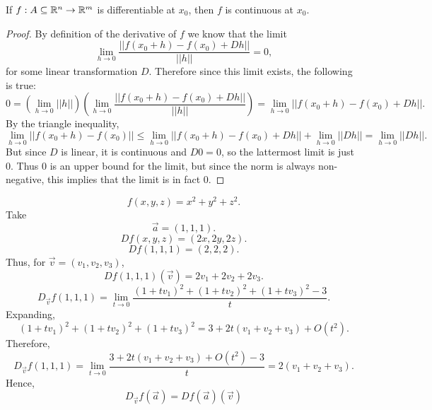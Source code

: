 \begin{proposition}
    If $f: A \subseteq \mathbb{R}^n \rightarrow \mathbb{R}^m$ is differentiable at $x_0$, then $f$ is continuous at $x_0$.
\end{proposition}
\begin{proof}
    By definition of the derivative of $f$ we know that the limit
$$
\lim_{h \rightarrow 0} \frac{|| f(x_0+h) - f(x_0) + D h || }{||h||} = 0,
$$
for some linear transformation $D$. Therefore since this limit exists, the following is true:
$$
0 = \left( \lim_{h \rightarrow 0} || h ||\right)\left( \lim_{h \rightarrow 0} \frac{|| f(x_0+h) - f(x_0) + D h || }{||h||} \right) = \lim_{h \rightarrow 0} ||f(x_0+h) - f(x_0) + Dh ||.
$$
By the triangle inequality,
$$
\lim_{h \rightarrow 0}||f(x_0+h) - f(x_0) || \leq \lim_{h \rightarrow 0}||f(x_0+h) - f(x_0) +Dh || + \lim_{h \rightarrow 0}||Dh || =\lim_{h \rightarrow 0}||Dh ||.
$$
But since $D$ is linear, it is continuous and $D0=0$, so the lattermost limit is just $0$. Thus $0$ is an upper bound for the limit, but since the norm is always non-negative, this implies that the limit is in fact $0$.
\end{proof}
\begin{example}
\[
f(x,y,z)=x^2+y^2+z^2.
\]
Take 
\[
\vec a=(1,1,1).
\]
\[
Df(x,y,z)=(2x,2y,2z).
\]
\[
Df(1,1,1)=(2,2,2).
\]
Thus, for $\vec v=(v_1,v_2,v_3)$,
\[
Df(1,1,1)(\vec v)
=
2v_1+2v_2+2v_3.
\]
\[
D_{\vec v}f(1,1,1)
=
\lim_{t\to0}
\frac{(1+tv_1)^2+(1+tv_2)^2+(1+tv_3)^2-3}{t}.
\]
Expanding,
\[
(1+tv_1)^2+(1+tv_2)^2+(1+tv_3)^2
=
3+2t(v_1+v_2+v_3)+O(t^2).
\]
Therefore,
\[
D_{\vec v}f(1,1,1)
=
\lim_{t\to0}
\frac{3+2t(v_1+v_2+v_3)+O(t^2)-3}{t}
=
2(v_1+v_2+v_3).
\]
Hence,
\[
\boxed{D_{\vec v}f(\vec a)=Df(\vec a)(\vec v)}
\]
\end{example}
